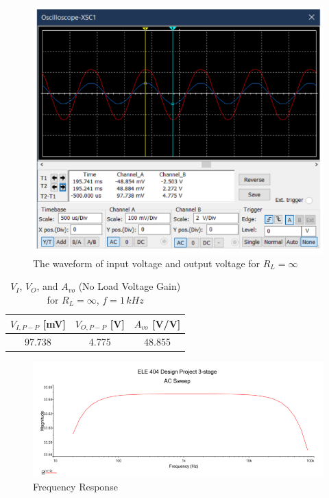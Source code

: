 \begin{figure}[H]
    \centering
    \includegraphics[width=16cm]{Pictures/Waveform.png}
    \caption{{The waveform of input voltage and output voltage for $R_L = \infty$}}
    \label{waveform-dia}
\end{figure}


\begin{table}[H]
\centering
\begin{tabular}{|c|c|c|}
\hline
\textbf{\(V_{I, P-P}\) [mV]} & \textbf{\(V_{O, P-P}\) [V]} & \textbf{\(A_{vo}\) [V/V]} \\ \hline
97.738 & 4.775 & 48.855 \\ \hline
\end{tabular}
\caption{\(V_I\), \(V_O\), and \(A_{vo}\) (No Load Voltage Gain) for \(R_L = \infty\), \(f = 1 \, kHz\)}
\label{table:E2}
\end{table}

\begin{figure}[H]
    \centering
    \includegraphics[width=16cm]{Pictures/Frequency-Response.png}
    \caption{{Frequency Response}}
    \label{freq-response}
\end{figure}
